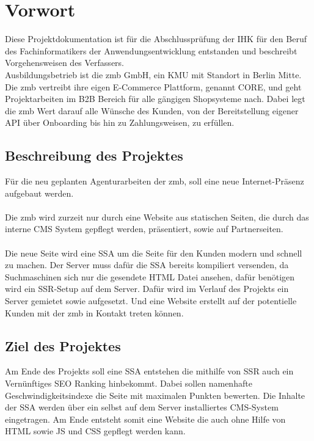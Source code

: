 \documentclass[11pt,a4paper]{article}
\begin{document}
\section{Vorwort}
Diese Projektdokumentation ist für die Abschlussprüfung der IHK für den Beruf des Fachinformatikers der Anwendungsentwicklung entstanden und beschreibt Vorgehensweisen des Verfassers.\\
Ausbildungsbetrieb ist die zmb GmbH, ein KMU mit Standort in Berlin Mitte.
Die zmb vertreibt ihre eigen E-Commerce Plattform, genannt CORE, und geht Projektarbeiten im \acs{B2B} Bereich für alle gängigen Shopsysteme nach.  
Dabei legt die zmb Wert darauf alle Wünsche des Kunden, von der Bereitstellung eigener API über Onboarding bis hin zu Zahlungsweisen, zu erfüllen. 
\subsection{Beschreibung des Projektes}
Für die neu geplanten Agenturarbeiten der zmb, soll eine neue Internet-Präsenz aufgebaut werden.\\\\
Die zmb wird zurzeit nur durch eine Website aus statischen Seiten, die durch das interne CMS System gepflegt werden, präsentiert, sowie auf Partnerseiten.\\\\
Die neue Seite wird eine \acs{SSA} um die Seite für den Kunden modern und schnell zu machen.  
Der Server muss dafür die \acs{SSA} bereits kompiliert versenden, da Suchmaschinen sich nur die gesendete HTML Datei ansehen, dafür benötigen wird ein \acs{SSR}-Setup auf dem Server.
Dafür wird im Verlauf des Projekts ein Server gemietet sowie aufgesetzt. Und eine Website erstellt auf der potentielle Kunden mit der zmb in Kontakt treten können.  
\subsection{Ziel des Projektes}
Am Ende des Projekts soll eine \acs{SSA} entstehen die mithilfe von \acs{SSR} auch ein Vernünftiges SEO Ranking hinbekommt. Dabei sollen namenhafte Geschwindigkeitsindexe die Seite mit maximalen Punkten bewerten.
Die Inhalte der \acs{SSA} werden über ein selbst auf dem Server installiertes CMS-System eingetragen.
Am Ende entsteht somit eine Website die auch ohne Hilfe von HTML sowie JS und CSS gepflegt werden kann.
\end{document}
